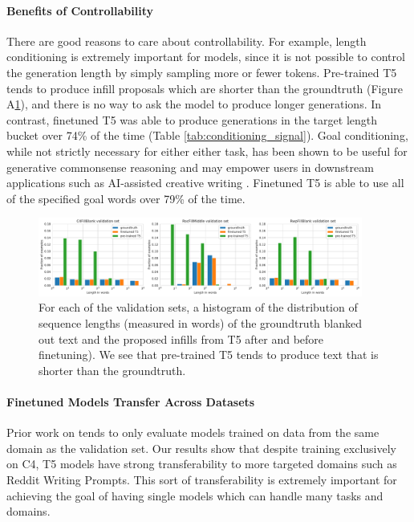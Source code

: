 \paragraph{Benefits of Controllability}
There are good reasons to care about controllability.
For example, length conditioning is extremely important for \FitB models, since it is not possible to control the generation length by simply sampling more or fewer tokens.
Pre-trained T5 tends to produce infill proposals which are shorter than the groundtruth (Figure A\ref{fig:t5_lengths}), and there is no way to ask the model to produce longer generations.
In contrast, finetuned T5 was able to produce generations in the target length bucket over 74\% of the time (Table \ref{tab:conditioning_signal}).
Goal conditioning, while not strictly necessary for either either task, has been shown to be useful for generative commonsense reasoning \citep{lin2020commongen} and may empower users in downstream applications such as AI-assisted creative writing \citep{roemmele2021inspiration}. 
Finetuned T5 is able to use all of the specified goal words over 79\% of the time.


\begin{figure}[tbp]
    \centering
    \includegraphics[width=0.95\textwidth]{figures/t5_lengths}
    \caption{For each of the \FitB{} validation sets, a histogram of the distribution of sequence lengths (measured in words) of the {groundtruth} blanked out text and the proposed infills from T5 {after} and {before} finetuning). We see that pre-trained T5 tends to produce text that is shorter than the groundtruth.}
    \label{fig:t5_lengths}
\end{figure}

\paragraph{Finetuned Models Transfer Across Datasets}
Prior work on \FitB{} tends to only evaluate models trained on data from the same domain as the validation set.
Our results show that despite training exclusively on C4, T5 models have strong transferability to more targeted domains such as Reddit Writing Prompts.
This sort of transferability is extremely important for achieving the goal of having single models which can handle many tasks and domains.

